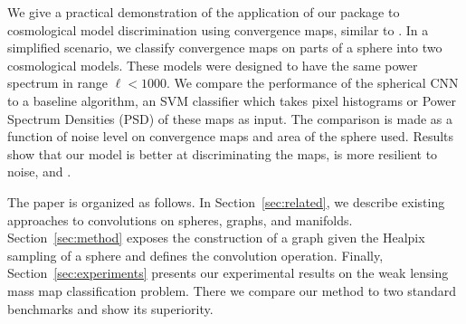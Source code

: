 \documentclass[final,twocolumn,3p,times,authoryear]{elsarticle}
\newcommand{\nati}[1]{{\color[rgb]{.1,.6,.1}{#1}}}
\newcommand{\todo}[1]{{\color[rgb]{.6,.1,.6}{#1}}}
\newcommand{\secref}[1]{Section~\ref{sec:#1}}
\newcommand{\1}{\b{1}}              %
\newcommand{\0}{\b{0}}              %
\begin{document}

We give a practical demonstration of the application of our package to cosmological model discrimination using convergence maps, similar to \citep{schmelze2017cosmologicalmodel}.
In a simplified scenario, we classify convergence maps on parts of a sphere into two cosmological models.
These models were designed to have the same power spectrum in range $\ell < 1000$.
We compare the performance of the spherical CNN to a baseline algorithm, an SVM classifier which takes pixel histograms or Power Spectrum Densities (PSD) of these maps as input.
The comparison is made as a function of noise level on convergence maps and area of the sphere used. Results show that our model is better at discriminating the maps, is more resilient to noise, and \todo{is faster?}.
\nati{I do not think we should argue for speed gain in this paper. We are probably much more efficient than scnns with the convolution done in the spectral domain. However compared to tradiationl methods, we are in most of the case slower.}


The paper is organized as follows.
In \secref{related}, we describe existing approaches to convolutions on spheres, graphs, and manifolds.
\secref{method} exposes the construction of a graph given the Healpix sampling of a sphere and defines the convolution operation.
Finally, \secref{experiments} presents our experimental results on the weak lensing mass map classification problem. There we compare our method to two standard benchmarks and show its superiority.

\end{document}
